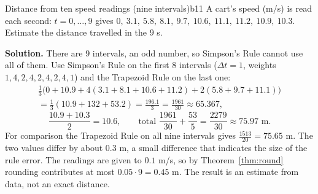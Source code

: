 \documentclass[11pt]{article}
\begin{document}
\begin{exmp}{Distance from ten speed readings (nine intervals)}{b11}
A cart's speed (m/s) is read each second: $t=0,\dots,9$ gives $0,\ 3.1,\ 5.8,\ 8.1,\ 9.7,\ 10.6,\ 11.1,\ 11.2,\ 10.9,\ 10.3$. Estimate the distance travelled in the $9$ s.

\textbf{Solution.} There are $9$ intervals, an odd number, so Simpson's Rule cannot use all of them. Use Simpson's Rule on the first $8$ intervals ($\Delta t=1$, weights $1,4,2,4,2,4,2,4,1$) and the Trapezoid Rule on the last one:
\[\begin{gathered}\frac13\bigl(0+10.9+4(3.1+8.1+10.6+11.2)+2(5.8+9.7+11.1)\bigr)\\=\frac13(10.9+132+53.2)=\frac{196.1}3=\frac{1961}{30}\approx65.367,\end{gathered}\]
\[\frac{10.9+10.3}2=10.6,\qquad\text{total }\frac{1961}{30}+\frac{53}5=\frac{2279}{30}\approx75.97\text{ m}.\]
For comparison the Trapezoid Rule on all nine intervals gives $\frac{1513}{20}=75.65$ m. The two values differ by about $0.3$ m, a small difference that indicates the size of the rule error. The readings are given to $0.1$ m/s, so by Theorem~\ref{thm:round} rounding contributes at most $0.05\cdot9=0.45$ m. The result is an estimate from data, not an exact distance.
\end{exmp}
\end{document}
